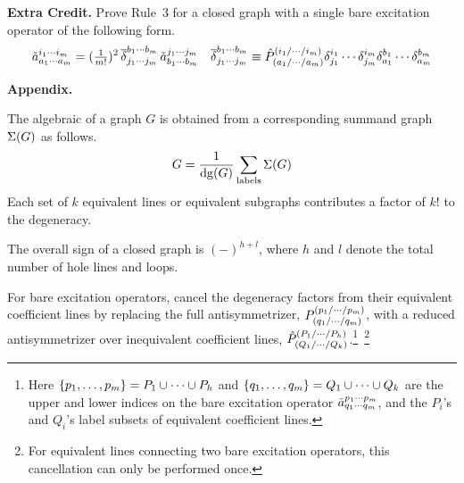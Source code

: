 \documentclass[11pt]{article}
\begin{document}
\newpage
\noindent
\textbf{Extra Credit.}
Prove Rule~3 for a closed graph with a single bare excitation operator of the following form.
\begin{align*}
  \tilde{a}^{i_1\cdots i_m}_{a_1\cdots a_m}
=
  (\tfrac{1}{m!})^2\,
  \overline{\delta }_{j_1\cdots j_m}^{b_1\cdots b_m}\,
  \tilde{a}^{j_1\cdots j_m}_{b_1\cdots b_m}
&&
  \overline{\delta }_{j_1\cdots j_m}^{b_1\cdots b_m}
\equiv
  \hat{P}_{(a_1/\cdots/a_m)}^{(i_1/\cdots/i_m)}
  \delta _{j_1}^{i_1}
  \cdots
  \delta _{j_m}^{i_m}
  \delta _{a_1}^{b_1}
  \cdots
  \delta _{a_m}^{b_m}
\end{align*}

\vfill
\noindent
\hrulefill

\noindent
\textbf{Appendix.}
\vspace{10pt}

{\small

\noindent
{}
The algebraic of a graph $G$ is obtained from a corresponding summand graph $\Sigma (G)$ as follows.
\begin{align*}
  G
=
  \frac {1}{\mathrm{dg}(G)}
  \sum_{\mathrm{labels}}\Sigma (G)
\end{align*}
\noindent
{}
  Each set of $k$ equivalent lines or equivalent subgraphs contributes a factor of $k!$ to the degeneracy.

\noindent
{}
  The overall sign of a closed graph is $(-)^{h+l}$, where $h$ and $l$ denote the total number of hole lines and loops.

\noindent
{}
  For bare excitation operators, cancel the degeneracy factors from their equivalent coefficient lines by replacing the full antisymmetrizer, $P^{(p_1/\cdots/p_m)}_{(q_1/\cdots/q_m)}$, with a reduced antisymmetrizer over inequivalent coefficient lines, $\hat{P}^{(P_1/\cdots /P_h)}_{(Q_1/\cdots /Q_k)}$.\footnote{
  Here $\{p_1,\ldots,p_m\}=P_1\cup\cdots\cup P_h$ and $\{q_1,\ldots,q_m\}=Q_1\cup\cdots\cup Q_k$ are the upper and lower indices on the bare excitation operator $\tilde{a}^{p_1\cdots p_m}_{q_1\cdots q_m}$, and the $P_i$'s and $Q_i$'s label subsets of equivalent coefficient lines.
}~\footnote{
  For equivalent lines connecting two bare excitation operators, this cancellation can only be performed once.
}
}
\end{document}

